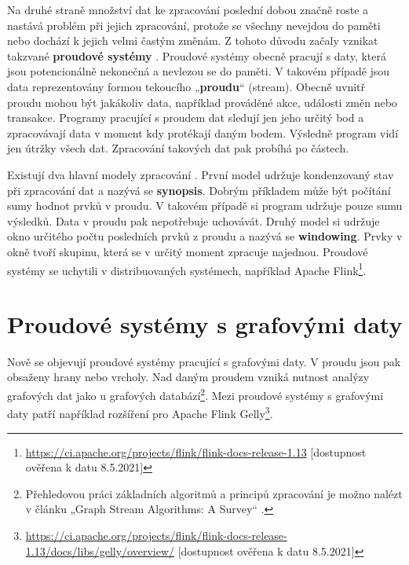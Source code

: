 Na druhé straně množství dat ke zpracování poslední dobou značně roste a nastává problém při jejich zpracování, protože se všechny nevejdou do paměti nebo dochází k jejich velmi častým změnám.  
Z tohoto důvodu začaly vznikat takzvané \textbf{proudové systémy} \citep{streaming}.
Proudové systémy obecně pracují s daty, která jsou potencionálně nekonečná a nevlezou se do paměti.
V takovém případě jsou data reprezentovány formou tekoucího „\textbf{proudu}“ (stream).
Obecně uvnitř proudu mohou být jakákoliv data, například prováděné akce, události změn nebo transakce.
Programy pracující s proudem dat sledují jen jeho určitý bod a zpracovávají data v moment kdy protékají daným bodem.
Výsledně program vidí jen útržky všech dat.
Zpracování takových dat pak probíhá po částech.

Existují dva hlavní modely zpracování \citep{graphstreaming}.
První model udržuje kondenzovaný stav při zpracování dat a nazývá se \textbf{synopsis}.
Dobrým příkladem může být počítání sumy hodnot prvků v proudu.
V takovém případě si program udržuje pouze sumu výsledků.
Data v proudu pak nepotřebuje uchovávát.
Druhý model si udržuje okno určitého počtu posledních prvků z proudu a nazývá se \textbf{windowing}.
Prvky v okně tvoří skupinu, která se v určitý moment zpracuje najednou.
Proudové systémy se uchytili v distribuovaných systémech, například Apache Flink\footnote{\url{https://ci.apache.org/projects/flink/flink-docs-release-1.13} [dostupnost ověřena k datu 8.5.2021]}.

\section*{Proudové systémy s grafovými daty}

Nově se objevují proudové systémy pracující s grafovými daty.
V proudu jsou pak obsaženy hrany nebo vrcholy. 
Nad daným proudem vzniká nutnost analýzy grafových dat jako u grafových databází\footnote{Přehledovou práci základních algoritmů a principů zpracování je možno nalézt v článku „Graph Stream Algorithms: A Survey“ \citep{graphstreamalgorithms}.}.
Mezi proudové systémy s grafovými daty patří například rozšíření pro Apache Flink Gelly\footnote{\url{https://ci.apache.org/projects/flink/flink-docs-release-1.13/docs/libs/gelly/overview/} [dostupnost ověřena k datu 8.5.2021]}.

